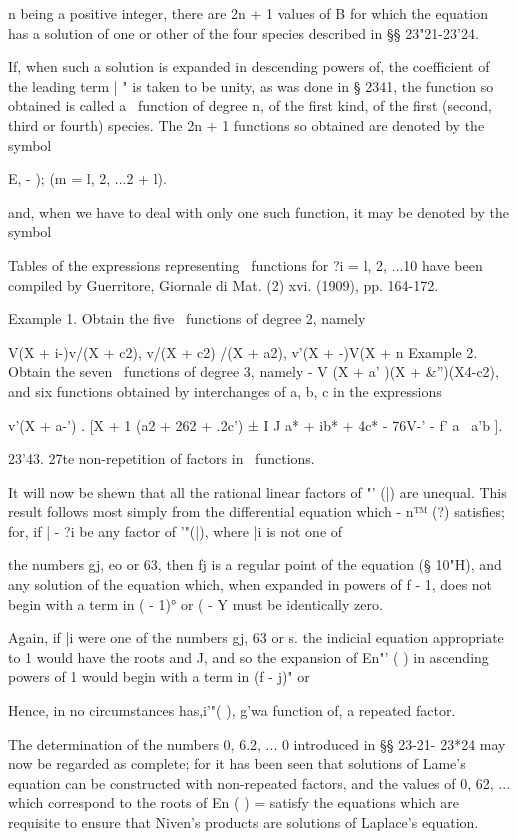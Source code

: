 {{{{{{{n being a positive integer, there are 2n + 1 values of B for which the
equation has a solution of one or other of the four species described
in §§ 23"21-23'24.

If, when such a solution is expanded in descending powers of, the
coefficient of the leading term | " is taken to be unity, as was done
in § 2341, the function so obtained is called a \Lame\ function of
degree n, of the first kind, of the first (second, third or fourth)
species. The 2n + 1 functions so obtained are denoted by the symbol

E, - ); (m = l, 2, ...2 + l).

and, when we have to deal with only one such function, it may be
denoted by the symbol

Tables of the expressions representing \Lame\ functions for ?i = l, 2,
...10 have been compiled by Guerritore, Giornale di Mat. (2) xvi.
(1909), pp. 164-172.

Example 1. Obtain the five \Lame\ functions of degree 2, namely

V(X + i-)v/(X + c2), v/(X + c2) /(X + a2), v'(X + -)V(X + n Example 2.
Obtain the seven \Lame\ functions of degree 3, namely - V (X + a' )(X +
\&'')(X4-c2), and six functions obtained by interchanges of a, b, c
in the expressions

v'(X + a-') . [X + 1 (a2 + 262 + .2c') ± I J a* + ib* + 4c* - 76V-' -
f' a \ a'b ].

23'43. 27te non-repetition of factors in \Lame\ functions.

It will now be shewn that all the rational linear factors of "' (|)
are unequal. This result follows most simply from the differential
equation which - n™ (?) satisfies; for, if | - ?i be any factor of
'"(|), where |i is not one of

%
%

the numbers gj, eo or 63, then fj is a regular point of the equation
(§ 10"H), and any solution of the equation which, when expanded in
powers of f - 1, does not begin with a term in ( - 1)° or ( - Y must
be identically zero.

Again, if |i were one of the numbers gj, 63 or s. the indicial
equation appropriate to 1 would have the roots and J, and so the
expansion of En"' ( ) in ascending powers of 1 would begin with a term
in (f - j)" or

Hence, in no circumstances has,i'"( ), g'wa function of, a repeated
factor.

The determination of the numbers 0, 6.2, ... 0 introduced in §§
23-21- 23*24 may now be regarded as complete; for it has been seen
that solutions of Lame's equation can be constructed with non-repeated
factors, and the values of 0, 62, ... which correspond to the roots
of En ( ) = satisfy the equations which are requisite to ensure that
Niven's products are solutions of Laplace's equation.

}}}}}}}
